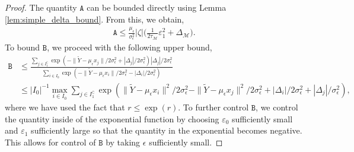 \documentclass[10pt,a4paper]{amsart}
\newcommand{\M}{{\mathcal{M}}}
\newcommand{\gap}{\Delta_\M}
\begin{document}
\begin{proof}
The quantity \(\mathtt{A}\) can be bounded directly using Lemma \ref{lem:simple_delta_bound}. From this, we obtain,
\begin{align*}
    \mathtt{A} \leq \frac{\mu_\epsilon}{\sigma^2_\epsilon} |\zeta| \Big ( \tfrac{1}{2 \tau_\M} \varepsilon_1^2 + \gap \Big ).
\end{align*}
To bound \(\mathtt{B}\), we proceed with the following upper bound,
\begin{align}
    \mathtt{B} &\leq \frac{\sum_{j \in I_1^\complement} \exp(-\|\tilde{Y} - \mu_\epsilon x_j\|/2\sigma_\epsilon^2 + |\Delta_j|/2\sigma_\epsilon^2) |\Delta_j|/2\sigma_\epsilon^2}{\sum_{i \in I_0}\exp(-\|\tilde{Y} - \mu_\epsilon x_i\|/2\sigma_\epsilon^2-|\Delta_i|/2\sigma_\epsilon^2)} \nonumber\\
    &\leq |I_0|^{-1} \max_{i \in I_0}\sum_{j \in I_1^\complement} \exp(\|\tilde{Y} - \mu_\epsilon x_i\|^2/2\sigma_\epsilon^2 - \|\tilde{Y} - \mu_\epsilon x_j\|^2/2\sigma_\epsilon^2 + |\Delta_i|/2\sigma_\epsilon^2 + |\Delta_j|/\sigma_\epsilon^2),\label{eq:drbg_3}
\end{align}
where we have used the fact that \(r \leq \exp(r)\). To further control \(\mathtt{B}\), we control the quantity inside of the exponential function by choosing \(\varepsilon_0\) sufficiently small and \(\varepsilon_1\) sufficiently large so that the quantity in the exponential becomes negative. This allows for control of \(\mathtt{B}\) by taking \(\epsilon\) sufficiently small.


\end{proof}
\end{document}
